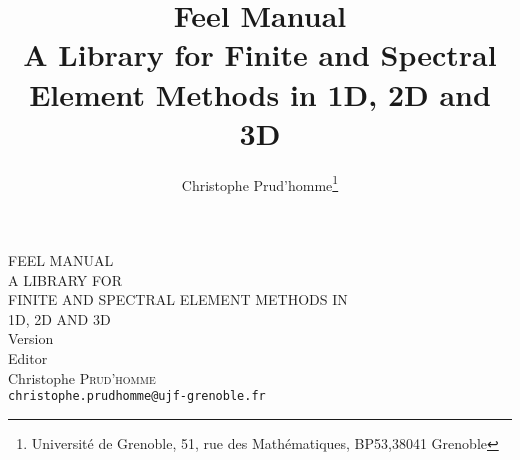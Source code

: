 \documentclass[a4paper]{book}
\title{Feel Manual\\
A Library for Finite and Spectral Element Methods in 1D, 2D and 3D\\
{\small \feelversion }}
\author{Christophe Prud'homme\thanks{Université de Grenoble,
51, rue des Mathématiques, BP53,38041 Grenoble}}
\date{}
\begin{document}
\thispagestyle{empty}






\begin{center}
  {\Large
    FEEL MANUAL\\
    A LIBRARY FOR \\
    FINITE AND SPECTRAL ELEMENT METHODS IN\\
    1D, 2D AND 3D\\
    \bigskip
    {\small Version \feelversion }}\\[0.6cm]
    Editor\\
  Christophe \textsc{Prud'homme}\\
  \texttt{christophe.prudhomme@ujf-grenoble.fr}\\
  \par\vspace{2cm}




\end{center}
\end{document}
